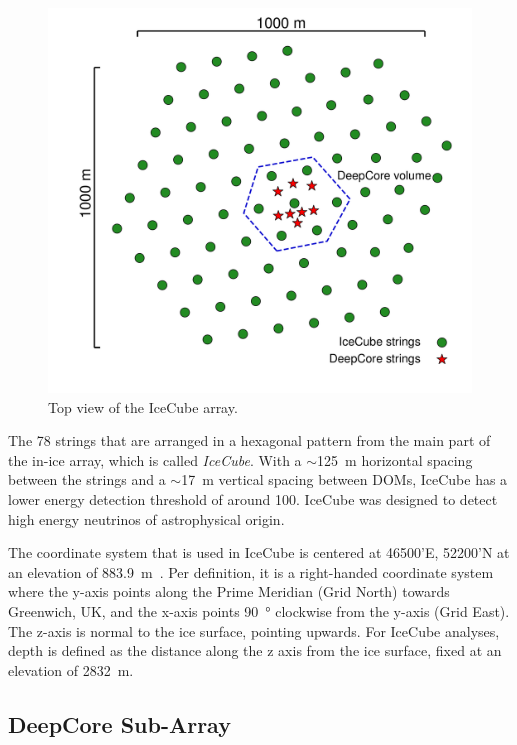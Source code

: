 \begin{figure}
    \includegraphics[trim={2.0cm, 1.5cm, 0, 0}, clip, width=0.65\linewidth]{figures/icecube_deepcore/icecube_top_view_bw.pdf}
    \caption[IceCube top view]{Top view of the IceCube array.}
\end{figure}

The 78 strings that are arranged in a hexagonal pattern from the main part of the in-ice array, which is called \textit{IceCube}. With a $\sim$\SI{125}{\meter} horizontal spacing between the strings and a $\sim$\SI{17}{\meter} vertical spacing between DOMs, IceCube has a lower energy detection threshold of around \SI{100}{\gev}. IceCube was designed to detect high energy neutrinos of astrophysical origin.

The coordinate system that is used in IceCube is centered at 46500'E, 52200'N at an elevation of \SI{883.9}{\meter}~\cite{2017JInst..12P3012A_Instrumentation_Systems}. Per definition, it is a right-handed coordinate system where the y-axis points along the Prime Meridian (Grid North) towards Greenwich, UK, and the x-axis points \SI{90}{\degree} clockwise from the y-axis (Grid East). The z-axis is normal to the ice surface, pointing upwards. For IceCube analyses, depth is defined as the distance along the z axis from the ice surface, fixed at an elevation of \SI{2832}{\meter}.


\subsection{DeepCore Sub-Array} 

